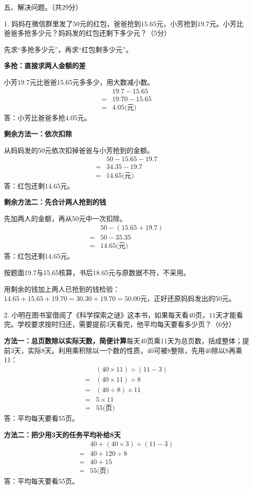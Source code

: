 五、解决问题。（共29分）\par 1. 妈妈在微信群里发了\(50\)元的红包，爸爸抢到\(15.65\)元，小芳抢到\(19.7\)元。小芳比爸爸多抢多少元？妈妈发的红包还剩下多少元？（5分）\par
\begin{BookAnswer}
先求“多抢多少元”，再求“红包剩多少元”。\par \textbf{多抢：直接求两人金额的差}\par 小芳19.7元比爸爸15.65元多多少，用大数减小数。\[\begin{aligned} &19.7-15.65\\ ={}&19.70-15.65\\ ={}&4.05\text{(元)}\end{aligned}\]答：小芳比爸爸多抢4.05元。\par \textbf{剩余方法一：依次扣除}\par 从妈妈发的50元依次扣掉爸爸与小芳抢到的金额。\[\begin{aligned} &50-15.65-19.7\\ ={}&34.35-19.7\\ ={}&14.65\text{(元)}\end{aligned}\]答：红包还剩14.65元。\par \textbf{剩余方法二：先合计两人抢到的钱}\par 先加两人的金额，再从50元中一次扣除。\[\begin{aligned} &50-(15.65+19.7)\\ ={}&50-35.35\\ ={}&14.65\text{(元)}\end{aligned}\]答：红包还剩14.65元。\par 按题面19.7与15.65核算，书后18.65元与原数据不符，不采用。\par 用剩余的钱加上两人已抢到的钱检验：\(14.65+15.65+19.70=30.30+19.70=50.00\)元，正好还原妈妈发出的50元。
\end{BookAnswer}

2. 小明在图书室借阅了《科学探索之谜》这本书，如果每天看\(40\)页，\allowbreak{}\(11\)天才能看完。学校要求按时归还，需要提前\(3\)天看完，他平均每天要看多少页？（6分）\par
\begin{BookAnswer}
\textbf{方法一：总页数除以实际天数，简便计算}每天40页乘11天为总页数，括成整体；提前3天，实际8天。利用乘积除以一个数的性质，40可被8整除，先用40除以8再乘11：\[\begin{aligned}&(40\times11)\div(11-3)\\={}&(40\times11)\div8\\={}&(40\div8)\times11\\={}&5\times11\\={}&55\text{(页)}\end{aligned}\]答：平均每天要看55页。\par\textbf{方法二：把少用3天的任务平均补给8天}\[\begin{aligned}&40+(40\times3)\div(11-3)\\={}&40+120\div8\\={}&40+15\\={}&55\text{(页)}\end{aligned}\]答：平均每天要看55页。
\end{BookAnswer}

